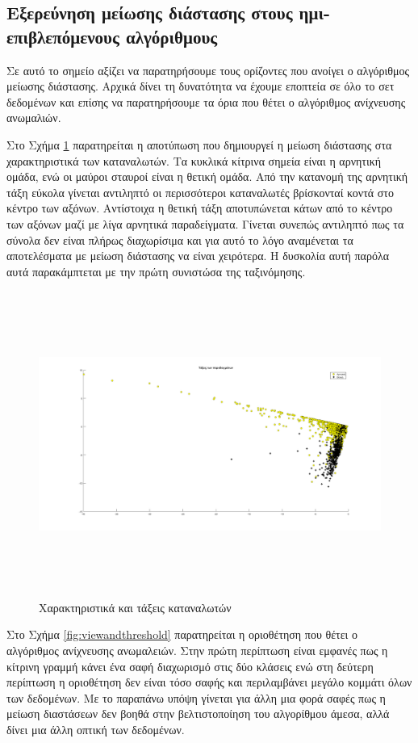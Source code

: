 \subsection{Εξερεύνηση μείωσης διάστασης στους ημι-επιβλεπόμενους αλγόριθμους}
Σε αυτό το σημείο αξίζει να παρατηρήσουμε τους ορίζοντες που ανοίγει ο αλγόριθμος μείωσης διάστασης. Αρχικά δίνει τη δυνατότητα να έχουμε εποπτεία σε όλο το σετ δεδομένων και επίσης να παρατηρήσουμε τα όρια που θέτει ο αλγόριθμος ανίχνευσης ανωμαλιών.\par
Στο Σχήμα \ref{fig:charclasscons} παρατηρείται η αποτύπωση που δημιουργεί η μείωση διάστασης στα χαρακτηριστικά των καταναλωτών. Τα κυκλικά κίτρινα σημεία είναι η αρνητική ομάδα, ενώ οι μαύροι σταυροί είναι η θετική ομάδα. Από την κατανομή της αρνητική τάξη εύκολα γίνεται αντιληπτό οι περισσότεροι καταναλωτές βρίσκονταί κοντά στο κέντρο των αξόνων. Αντίστοιχα η θετική τάξη αποτυπώνεται κάτων από το κέντρο των αξόνων μαζί με λίγα αρνητικά παραδείγματα. Γίνεται συνεπώς αντιληπτό πως τα σύνολα δεν είναι πλήρως διαχωρίσιμα και για αυτό το λόγο αναμένεται τα αποτελέσματα με μείωση διάστασης να είναι χειρότερα. Η δυσκολία αυτή παρόλα αυτά παρακάμπτεται με την πρώτη συνιστώσα της ταξινόμησης.\par
\begin{figure}
 \includegraphics[width=160mm, height=100mm]{../../plots/gr_class_semi_sup.png}
\caption{Χαρακτηριστικά και τάξεις καταναλωτών}
\label{fig:charclasscons}
\end{figure}
Στο Σχήμα \ref{fig:viewandthreshold} παρατηρείται η οριοθέτηση που θέτει ο αλγόριθμος ανίχνευσης ανωμαλειών. Στην πρώτη περίπτωση είναι εμφανές πως η κίτρινη γραμμή κάνει ένα σαφή διαχωρισμό στις δύο κλάσεις ενώ στη δεύτερη περίπτωση η οριοθέτηση δεν είναι τόσο σαφής και περιλαμβάνει μεγάλο κομμάτι όλων των δεδομένων. Με το παραπάνω υπόψη γίνεται για άλλη μια φορά σαφές πως η μείωση διαστάσεων δεν βοηθά στην βελτιστοποίηση του αλγορίθμου άμεσα, αλλά δίνει μια άλλη οπτική των δεδομένων.
